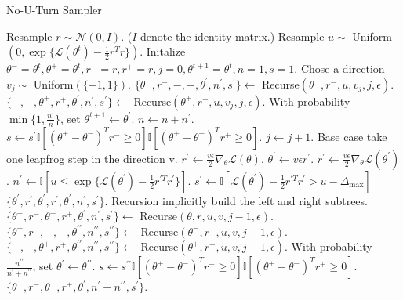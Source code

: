 \begin{algorithm}[H]
	\caption{No-U-Turn Sampler \cite{hoffman2011no}}
	\label{nuts_algo}
	\begin{algorithmic}[1]
		\State Resample $r \sim \mathcal{N} (0,I)$. ($I$ denote the identity matrix.)
		\State Resample $u \sim$ Uniform$(0,\exp\{\mathcal{L}(\theta^{t}) - \frac{1}{2}r^{T}r\})$. 
		\State Initalize $\theta^{-} = \theta^{t},\theta^{+} = \theta^{t}, r^{-} = r,r^{+} = r,j=0,\theta^{t+1} = \theta^{t},n=1,s=1.$
			\State Chose a direction $v_{j} \sim$ Uniform$(\{-1,1\})$.
				\State $\{ \theta^{-},r^{-},-,-,\theta^{\prime},n^{\prime},s^{\prime} \} \leftarrow $ Recurse$(\theta^{-},r^{-},u,v_{j},j,\epsilon)$.
			\Else
				\State $\{ -,-,\theta^{+},r^{+},\theta^{\prime},n^{\prime},s^{\prime} \} \leftarrow $ Recurse$(\theta^{+},r^{+},u,v_{j},j,\epsilon)$.
			\EndIf
				\State With probability $\min\{ 1,\frac{n^{\prime}}{n} \}$, set $\theta^{t+1} \leftarrow \theta^{\prime} $.
			\EndIf
			\State $n \leftarrow n + n^{\prime}$.
			\State $s \leftarrow s^{\prime} \mathbb{I} \left[ (\theta^{+} - \theta^{-})^{T} r^{-} \geq 0  \right] \mathbb{I} \left[ (\theta^{+} - \theta^{-})^{T} r^{+} \geq 0  \right]  $.
			\State $j \leftarrow j+1$.
		\EndWhile
				\State Base case take one leapfrog step in the direction v.
				\State $r^{\prime} \leftarrow \frac{v \epsilon}{2} \nabla_{\theta} \mathcal{L} (\theta)$.
				\State $\theta^{\prime} \leftarrow v \epsilon r^{\prime}$.
				\State $r^{\prime} \leftarrow \frac{v \epsilon}{2} \nabla_{\theta} \mathcal{L} (\theta^{\prime})$.
				\State $n^{\prime} \leftarrow \mathbb{I} \left[ u \leq \exp \{ \mathcal{L} (\theta^{\prime}) - \frac{1}{2} r^{\prime T} r^{\prime}\} \right] $.
				\State $s^{\prime} \leftarrow \mathbb{I} \left[ \mathcal{L} (\theta^{\prime}) - \frac{1}{2} r^{\prime T} r^{\prime} > u - \Delta_{\max}  \right] $
				\State \Return $\{ \theta^{\prime},r^{\prime},\theta^{\prime},r^{\prime},\theta^{\prime},n^{\prime},s^{\prime} \}$.
			\Else
				\State Recursion implicitly build the left and right subtrees.
				\State $\{ \theta^{-},r^{-},\theta^{+},r^{+},\theta^{\prime},n^{\prime},s^{\prime} \} \leftarrow $ Recurse$(\theta,r,u,v,j-1,\epsilon)$.
						\State $\{ \theta^{-},r^{-},-,-,\theta^{\prime \prime},n^{\prime \prime},s^{\prime \prime} \} \leftarrow $ Recurse$(\theta^{-},r^{-},u,v,j-1,\epsilon)$.
					\Else
						\State $\{ -,-,\theta^{+},r^{+},\theta^{\prime \prime},n^{\prime \prime},s^{\prime \prime} \} \leftarrow $ Recurse$(\theta^{+},r^{+},u,v,j-1,\epsilon)$.
					\EndIf
					\State With probability $\frac{n^{\prime \prime}}{n^{\prime} + n^{\prime \prime}}$, set $\theta^{\prime} \leftarrow \theta^{\prime \prime}$.
					\State $s \leftarrow s^{\prime \prime} \mathbb{I} \left[ (\theta^{+} - \theta^{-})^{T} r^{-} \geq 0  \right] \mathbb{I} \left[ (\theta^{+} - \theta^{-})^{T} r^{+} \geq 0  \right]  $. 
				\EndIf
				\State \Return $\{ \theta^{-},r^{-},\theta^{+},r^{+},\theta^{\prime},n^{\prime} + n^{\prime \prime},s^{\prime} \}$.
			\EndIf
		\EndFunction
	\end{algorithmic}
\end{algorithm}

